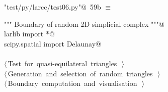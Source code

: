 \documentclass[11pt,oneside]{article}	%
\begin{document}
\begin{flushleft} \small
\begin{minipage}{\linewidth} \label{scrap113}
\protect{}\verb@"test/py/larcc/test06.py"@\nobreak\ {\footnotesize 59b }$\equiv$
\vspace{-1ex}
\begin{list}{}{} \item
\mbox{}\verb@""" Boundary of random 2D simplicial complex """@\\
\mbox{}\verb@from larlib import *@\\
\mbox{}\verb@from scipy.spatial import Delaunay@\\
\mbox{}\verb@@\\
\mbox{}\verb@@\hbox{$\langle\,$Test for quasi-equilateral triangles\nobreak\ {\footnotesize {}}$\,\rangle$}\verb@@\\
\mbox{}\verb@@\hbox{$\langle\,$Generation and selection of random triangles\nobreak\ {\footnotesize {}}$\,\rangle$}\verb@@\\
\mbox{}\verb@@\hbox{$\langle\,$Boundary computation and visualisation\nobreak\ {\footnotesize {}}$\,\rangle$}\verb@@\\
\mbox{}\verb@@{\NWsep}
\end{list}
\vspace{-2ex}
\end{minipage}\\[4ex]
\end{flushleft}
\end{document}
